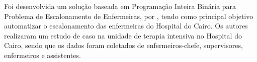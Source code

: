 


Foi desenvolvida um solução baseada em Programação Inteira Binária para Problema de Escalonamento de Enfermeiras, por \cite{Zen-El-Din:2012}, tendo como principal objetivo automatizar o escalonamento das enfermeiras do Hospital do Cairo. Os autores realizaram um estudo de caso  na unidade de terapia intensiva no Hospital do Cairo, sendo que os dados foram coletados de enfermeiros-chefe, supervisores, enfermeiros e assistentes.



